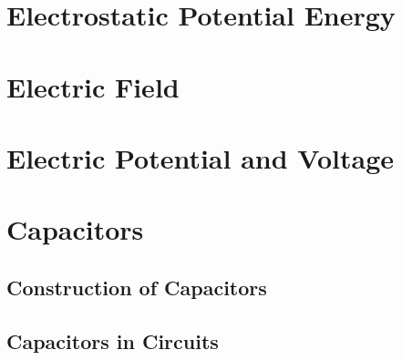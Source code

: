 	
	
	
	
	
	\section{Electrostatic Potential Energy}
	\section{Electric Field}
	\section{Electric Potential and Voltage}
	\section{Capacitors}
		\subsection{Construction of Capacitors}
		\subsection{Capacitors in Circuits}
		
	
	
	

	


